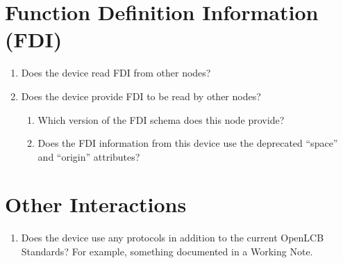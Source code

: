\section{Function Definition Information (FDI)}
    \begin{enumerate}
        \item Does the device read FDI from other nodes?
        \item Does the device provide FDI to be read by other nodes?
        \begin{enumerate}
            \item Which version of the FDI schema does this node provide?
            \item Does the FDI information from this device use the 
                deprecated ``space'' and ``origin'' attributes?
        \end{enumerate}
    \end{enumerate}

\section{Other Interactions}
    \begin{enumerate}
        \item Does the device use any protocols in addition to the current
            OpenLCB Standards?  For example, something documented in a Working Note.
    \end{enumerate}


  

